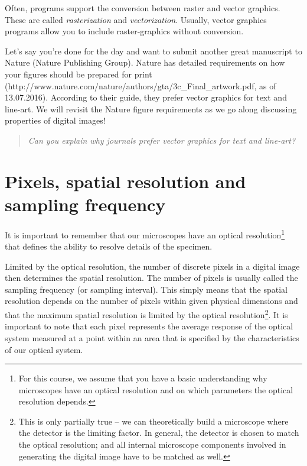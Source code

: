 Often, programs support the conversion between raster and vector graphics. These are called \emph{rasterization} and \emph{vectorization}. Usually, vector graphics programs allow you to include raster-graphics without conversion.

Let's say you're done for the day and want to submit another great manuscript to Nature (Nature Publishing Group). Nature has detailed requirements on how your figures should be prepared for print (http://www.nature.com/nature/authors/gta/3c\_Final\_artwork.pdf, as of 13.07.2016). According to their guide, they prefer vector graphics for text and line-art. We will revisit the Nature figure requirements as we go along discussing properties of digital images!

\begin{verse}
\emph{Can you explain why journals prefer vector graphics for text and line-art?}
\end{verse}

\section{Pixels, spatial resolution and sampling frequency}
\label{sec:mod1-samplingrate}

It is important to remember that our microscopes have an optical resolution\footnote{For this course, we assume that you have a basic understanding why microscopes have an optical resolution and on which parameters the optical resolution depends.} that defines the ability to resolve details of the specimen. 

Limited by the optical resolution, the number of discrete pixels in a digital image then determines the spatial resolution. The number of pixels is usually called the sampling frequency (or sampling interval). This simply means that the spatial resolution depends on the number of pixels within given physical dimensions and that the maximum spatial resolution is limited by the optical resolution\footnote{This is only partially true -- we can theoretically build a microscope where the detector is the limiting factor. In general, the detector is chosen to match the optical resolution; and all internal microscope components involved in generating the digital image have to be matched as well.}. It is important to note that each pixel represents the average response of the optical system measured at a point within an area that is specified by the characteristics of our optical system. 

